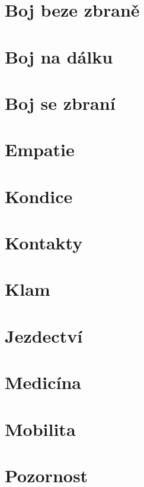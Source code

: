 \documentclass[../main.tex]{subfiles}
\begin{document}
\section{Boj beze zbraně}
\label{sec:bojbezezbrane}

\section{Boj na dálku}
\label{sec:bojnadalku}

\section{Boj se zbraní}
\label{sec:bojsezbrani}

\section{Empatie}
\label{sec:empatie}

\section{Kondice}
\label{sec:kondice}

\section{Kontakty}
\label{sec:kontakty}

\section{Klam}
\label{sec:klam}

\section{Jezdectví}
\label{sec:jezdectvi}

\section{Medicína}
\label{sec:medicina}

\section{Mobilita}
\label{sec:mobilita}

\section{Pozornost}
\label{sec:pozornost}
\end{document}
